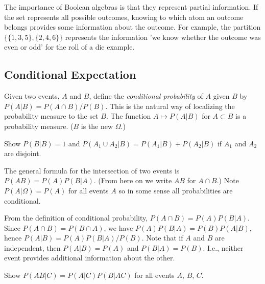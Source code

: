 The importance of Boolean algebras is that they represent partial information. If the
set represents all possible outcomes, knowing to which atom an outcome belongs provides
some information about the outcome. For example, the partition $\{\{1,3,5\},\{2,4,6\}\}$
represents the information 'we know whether the outcome was even or odd' for the
roll of a die example.

\subsection{Conditional Expectation}
Given two events, $A$ and $B$, define the {\em conditional probability}
of $A$ given $B$ by $P(A|B) = P(A\cap B)/P(B)$. This is the natural
way of localizing the probability measure to the set $B$. The
function $A\mapsto P(A|B)$ for $A\subset B$ is a probability measure.
($B$ is the new $\Omega$.) 
\begin{exercise}
Show $P(B|B) = 1$ and $P(A_1\cup A_2|B) = P(A_1|B) + P(A_2|B)$
if $A_1$ and $A_2$ are disjoint.
\end{exercise}

The general formula for the intersection of two events is $P(AB)
= P(A)P(B|A)$. (From here on we write $AB$ for $A\cap B$.)  Note 
$P(A|\Omega) = P(A)$ for all events $A$ so in some sense all 
probabilities are conditional.

From the definition of conditional probability, $P(A\cap B) = P(A)P(B|A)$. Since
$P(A\cap B) = P(B\cap A)$, we have $P(A)P(B|A) = P(B)P(A|B)$, hence
$P(A|B) = P(A)P(B|A)/P(B)$.
Note that if $A$ and $B$ are independent, then $P(A|B) = P(A)$ and
$P(B|A) = P(B)$. I.e., neither event provides additional information
about the other.

\begin{exercise}
Show $P(AB|C) = P(A|C) P(B|AC)$ for all events $A$, $B$, $C$.
\end{exercise}

